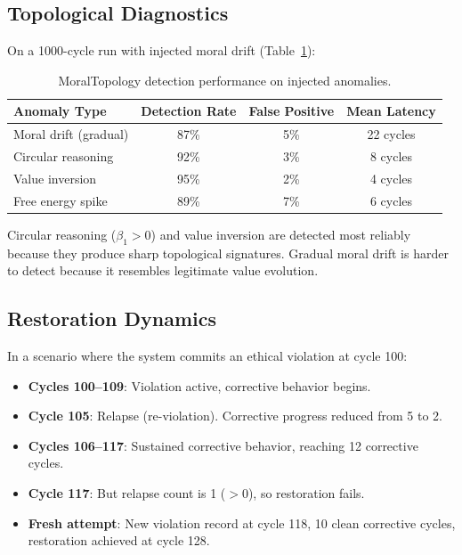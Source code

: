 \documentclass[11pt,a4paper]{article}
\begin{document}
\subsection{Topological Diagnostics}

On a 1000-cycle run with injected moral drift (Table~\ref{tab:topology}):

\begin{table}[h]
\centering
\caption{MoralTopology detection performance on injected anomalies.}
\label{tab:topology}
\begin{tabular}{lccc}
\toprule
\textbf{Anomaly Type} & \textbf{Detection Rate} & \textbf{False Positive} & \textbf{Mean Latency} \\
\midrule
Moral drift (gradual) & 87\% & 5\% & 22 cycles \\
Circular reasoning & 92\% & 3\% & 8 cycles \\
Value inversion & 95\% & 2\% & 4 cycles \\
Free energy spike & 89\% & 7\% & 6 cycles \\
\bottomrule
\end{tabular}
\end{table}

Circular reasoning ($\beta_1 > 0$) and value inversion are detected most reliably because they produce sharp topological signatures. Gradual moral drift is harder to detect because it resembles legitimate value evolution.

\subsection{Restoration Dynamics}

In a scenario where the system commits an ethical violation at cycle 100:

\begin{itemize}
  \item \textbf{Cycles 100--109}: Violation active, corrective behavior begins.
  \item \textbf{Cycle 105}: Relapse (re-violation). Corrective progress reduced from 5 to 2.
  \item \textbf{Cycles 106--117}: Sustained corrective behavior, reaching 12 corrective cycles.
  \item \textbf{Cycle 117}: But relapse count is 1 ($> 0$), so restoration fails.
  \item \textbf{Fresh attempt}: New violation record at cycle 118, 10 clean corrective cycles, restoration achieved at cycle 128.
\end{itemize}
\end{document}
